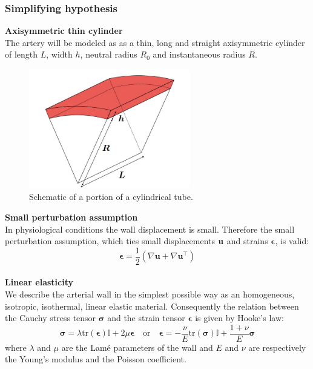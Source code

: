 \documentclass[12pt,a4paper]{article}
\numberwithin{equation}{section}
\begin{document}
\subsubsection{Simplifying hypothesis}
{\bf Axisymmetric thin cylinder}\\
The artery will be modeled as as a thin, long and straight axisymmetric cylinder of length $L$, width $h$, neutral radius $R_0$ and instantaneous radius $R$.\\
\begin{figure}[H]
\centering
\includegraphics[width=7cm]{scematic_portion_artery.jpg}
\caption{Schematic of a portion of a cylindrical tube.}
\label{fig:solid_}
\end{figure}
\noindent
{\bf Small perturbation assumption}\\
In physiological conditions the wall displacement is small. Therefore the small perturbation assumption, which ties small displacements ${\bf u}$ and strains $\boldsymbol{\epsilon}$, is valid:\\
\begin{equation*}
	\boldsymbol{\epsilon} = \frac{1}{2}(\nabla 	\boldsymbol{u} + \nabla \boldsymbol{u}^\top)
\end{equation*}
\\
{\bf Linear elasticity}\\
We describe the arterial wall in the simplest possible way as an homogeneous, isotropic, isothermal, linear elastic material. Consequently the relation between the Cauchy stress tensor $\boldsymbol{\sigma}$ and the strain tensor $\boldsymbol{\epsilon}$ is given by Hooke's law:
\begin{equation} \label{neo_hook}
	\boldsymbol{\sigma} = \lambda \textrm{tr}(\boldsymbol{\epsilon})\mathbb{I} + 2\mu \boldsymbol{\epsilon} \quad \textrm{or} \quad \boldsymbol{\epsilon} = -\frac{\nu}{E}\textrm{tr}(\boldsymbol{\sigma})\mathbb{I} + \frac{1+\nu}{E}\boldsymbol{\sigma}
\end{equation}
where $\lambda$ and $\mu$ are the Lamé parameters of the wall and $E$ and $\nu$ are respectively the Young's modulus and the Poisson coefficient.\\
\end{document}
